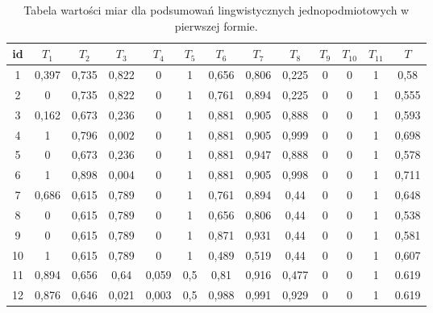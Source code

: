 \documentclass{classrep}
\begin{document}
\begin{center}
  \begin{table}[H]
    \begin{adjustbox}{center=14cm}
    \begin{tabularx}{\textwidth}{ccccccccccccc}
    
    id & $T_1$ & $T_2$ & $T_3$ & $T_4$ & $T_5$ & $T_6$ & $T_7$ & $T_8$ & $T_9$ & $T_{10}$ & $T_{11}$ & $T$ \\ \hline 

    1 & 0,397  & 0,735  & 0,822  & 0  & 1  & 0,656  & 0,806  & 0,225  & 0  & 0  & 1  & 0,58\\ \hline
    2 & 0  & 0,735  & 0,822  & 0  & 1  & 0,761  & 0,894  & 0,225  & 0  & 0  & 1  & 0,555\\ \hline
    3 & 0,162  & 0,673  & 0,236  & 0  & 1  & 0,881  & 0,905  & 0,888  & 0  & 0  & 1  & 0,593 \\ \hline
    4 & 1  & 0,796  & 0,002  & 0  & 1  & 0,881  & 0,905  & 0,999  & 0  & 0  & 1  & 0,698  \\ \hline
    5 & 0  & 0,673  & 0,236  & 0  & 1  & 0,881  & 0,947  & 0,888  & 0  & 0  & 1  & 0,578  \\ \hline  
    6 & 1  & 0,898  & 0,004  & 0  & 1  & 0,881  & 0,905  & 0,998  & 0  & 0  & 1  & 0,711  \\ \hline  
    7 & 0,686  & 0,615  & 0,789  & 0  & 1  & 0,761  & 0,894  & 0,44  & 0  & 0  & 1  & 0,648 \\ \hline 
    8 & 0  & 0,615  & 0,789  & 0  & 1  & 0,656  & 0,806  & 0,44  & 0  & 0  & 1  & 0,538 \\ \hline
    9 & 0  & 0,615  & 0,789  & 0  & 1  & 0,871  & 0,931  & 0,44  & 0  & 0  & 1  & 0,581 \\ \hline 
    10 & 1  & 0,615  & 0,789  & 0  & 1  & 0,489  & 0,519  & 0,44  & 0  & 0  & 1  & 0,607 \\ \hline 
    11 & 0,894 & 0,656 & 0,64 & 0,059 & 0,5 & 0,81 & 0,916 & 0,477 & 0 & 0 & 1 & 0.619 \\ \hline
    12 & 0,876 & 0,646 & 0,021 & 0,003 & 0,5 & 0,988 & 0,991 & 0,929 & 0 & 0 & 1 & 0.619 \\ \hline

  \end{tabularx}
\end{adjustbox}
  \caption{Tabela wartości miar dla podsumowań lingwistycznych jednopodmiotowych w pierwszej formie.}
\end{table}
\end{center}
\end{document}
